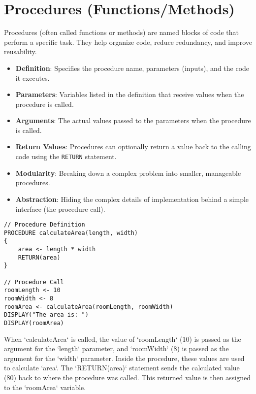 \documentclass[11pt,oneside]{book}
\begin{document}
\section{Procedures (Functions/Methods)}
\label{sec:procedures}
Procedures (often called functions or methods) are named blocks of code that perform a specific task. They help organize code, reduce redundancy, and improve reusability.
\begin{itemize}
    \item \textbf{Definition}: Specifies the procedure name, parameters (inputs), and the code it executes.
    \item \textbf{Parameters}: Variables listed in the definition that receive values when the procedure is called.
    \item \textbf{Arguments}: The actual values passed to the parameters when the procedure is called.
    \item \textbf{Return Values}: Procedures can optionally return a value back to the calling code using the \texttt{RETURN} statement.
    \item \textbf{Modularity}: Breaking down a complex problem into smaller, manageable procedures.
    \item \textbf{Abstraction}: Hiding the complex details of implementation behind a simple interface (the procedure call).
\end{itemize}
\begin{lstlisting}[language={}, label={lst:procedure}, caption={AP Pseudocode: Procedure Definition and Call}]
// Procedure Definition
PROCEDURE calculateArea(length, width)
{
    area <- length * width
    RETURN(area)
}

// Procedure Call
roomLength <- 10
roomWidth <- 8
roomArea <- calculateArea(roomLength, roomWidth)
DISPLAY("The area is: ")
DISPLAY(roomArea)
\end{lstlisting}
When `calculateArea` is called, the value of `roomLength` (10) is passed as the argument for the `length` parameter, and `roomWidth` (8) is passed as the argument for the `width` parameter. Inside the procedure, these values are used to calculate `area`. The `RETURN(area)` statement sends the calculated value (80) back to where the procedure was called. This returned value is then assigned to the `roomArea` variable.
\end{document}
